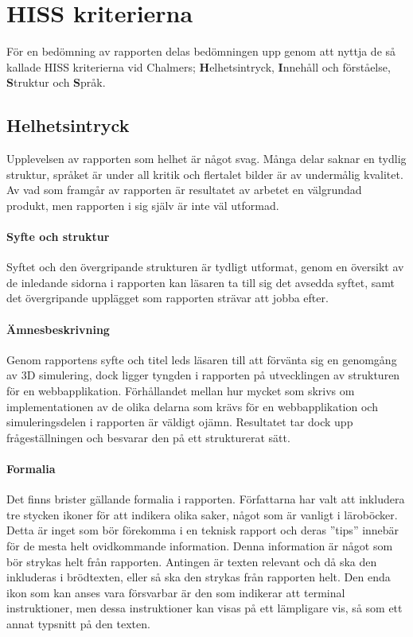 \section{HISS kriterierna} %
\label{sec:hiss}
    För en bedömning av rapporten delas bedömningen upp genom att nyttja de så kallade HISS kriterierna vid Chalmers; \textbf{H}elhetsintryck, \textbf{I}nnehåll och förståelse, \textbf{S}truktur och \textbf{S}pråk.

    \subsection{Helhetsintryck} %
    \label{sub:helhetsintryck}
        Upplevelsen av rapporten som helhet är något svag. Många delar saknar en tydlig struktur, språket är under all kritik och flertalet bilder är av undermålig kvalitet. Av vad som framgår av rapporten är resultatet av arbetet en välgrundad produkt, men rapporten i sig själv är inte väl utformad.

        \paragraph{Syfte och struktur}
            Syftet och den övergripande strukturen är tydligt utformat, genom en översikt av de inledande sidorna i rapporten kan läsaren ta till sig det avsedda syftet, samt det övergripande upplägget som rapporten strävar att jobba efter.

        \paragraph{Ämnesbeskrivning}
            Genom rapportens syfte och titel leds läsaren till att förvänta sig en genomgång av 3D simulering, dock ligger tyngden i rapporten på utvecklingen av strukturen för en webbapplikation. Förhållandet mellan hur mycket som skrivs om implementationen av de olika delarna som krävs för en webbapplikation och simuleringsdelen i rapporten är väldigt ojämn. Resultatet tar dock upp frågeställningen och besvarar den på ett strukturerat sätt.

        \paragraph{Formalia}
            Det finns brister gällande formalia i rapporten. Författarna har valt att inkludera tre stycken ikoner för att indikera olika saker, något som är vanligt i läroböcker. Detta är inget som bör förekomma i en teknisk rapport och deras ''tips'' innebär för de mesta helt ovidkommande information. Denna information är något som bör strykas helt från rapporten. Antingen är texten relevant och då ska den inkluderas i brödtexten, eller så ska den strykas från rapporten helt. Den enda ikon som kan anses vara försvarbar är den som indikerar att terminal instruktioner, men dessa instruktioner kan visas på ett lämpligare vis, så som ett annat typsnitt på den texten.

